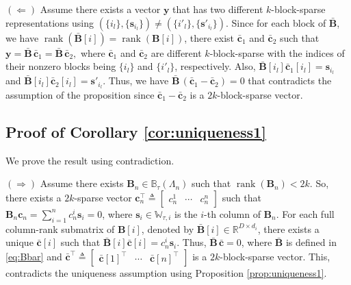 \documentclass[10pt,twocolumn,twoside] {IEEEtran}
\begin{document}
{\noindent
$(\Longleftarrow)$ Assume there exists a vector ${\boldsymbol{y}}$ that has two different $k$-block-sparse representations using $(\{i_l\},\{{\boldsymbol{s}}_{i_l}\}) \neq (\{i'_l\},\{{\boldsymbol{s}}'_{i_l}\})$. 
Since for each block of $\bar{\boldsymbol{B}}$, we have ${\operatorname{rank}}(\bar{\boldsymbol{B}}[i]) = {\operatorname{rank}}({\boldsymbol{B}}[i])$, there exist $\bar{\boldsymbol{c}}_1$ and $\bar{\boldsymbol{c}}_2$ such that ${\boldsymbol{y}} = \bar{\boldsymbol{B}} \, \bar{\boldsymbol{c}}_1 = \bar{\boldsymbol{B}} \, \bar{\boldsymbol{c}}_2,$ where $\bar{\boldsymbol{c}}_1$ and $\bar{\boldsymbol{c}}_2$ are different $k$-block-sparse with the indices of their nonzero blocks being $\{i_l\}$ and $\{i'_l\}$, respectively. Also, $\bar{\boldsymbol{B}}[i_l] \bar{\boldsymbol{c}}_1[i_l] = {\boldsymbol{s}}_{i_l}$ and $\bar{\boldsymbol{B}}[i_l] \bar{\boldsymbol{c}}_2[i_l] = {\boldsymbol{s}}'_{i_l}$. Thus, we have $\bar{\boldsymbol{B}} \, (\bar{\boldsymbol{c}}_1 - \bar{\boldsymbol{c}}_2) = 0$ that contradicts the assumption of the proposition since $\bar{\boldsymbol{c}}_1 - \bar{\boldsymbol{c}}_2$ is a $2k$-block-sparse vector.

\vspace{0mm}
\subsection{Proof of Corollary \ref{cor:uniqueness1} }
\label{app:uniquenesscor}
\noindent We prove the result using contradiction. 

\noindent $(\Longrightarrow)$ Assume there exists ${\boldsymbol{B}}_n \in \mathbb{B}_{\tau}(\Lambda_n)$ such that ${\operatorname{rank}}({\boldsymbol{B}}_n) < 2k$. So, there exists a $2k$-sparse vector ${\boldsymbol{c}}_n^{\top} \triangleq \begin{bmatrix} c_n^1 \!& \cdots \!& c_n^n \end{bmatrix}$ such that ${\boldsymbol{B}}_n {\boldsymbol{c}}_n = \sum_{i=1}^{n}{c_n^i {\boldsymbol{s}}_i} = 0$, where ${\boldsymbol{s}}_i \in \mathbb{W}_{\tau, i}$ is the $i$-th column of ${\boldsymbol{B}}_n$. For each  full column-rank submatrix of ${\boldsymbol{B}}[i]$, denoted by $\bar{\boldsymbol{B}}[i] \in {\mathbb{R}}^{D \times d_i}$, there exists a unique $\bar{\boldsymbol{c}}[i]$ such that $\bar{\boldsymbol{B}}[i] \bar{\boldsymbol{c}}[i] = c_n^i {\boldsymbol{s}}_i$. Thus, $\bar{\boldsymbol{B}} \, \bar{\boldsymbol{c}} = 0$, where $\bar{\boldsymbol{B}}$ is defined in \eqref{eq:Bbar} and $\bar{\boldsymbol{c}}^{\top} \triangleq \begin{bmatrix} \bar{\boldsymbol{c}}[1]^{\top} \!\! & \!\! \cdots & \bar{\boldsymbol{c}}[n]^{\top} \end{bmatrix}$ is a $2k$-block-sparse vector. This, contradicts the uniqueness assumption using Proposition \ref{prop:uniqueness1}. 

}
\end{document}
